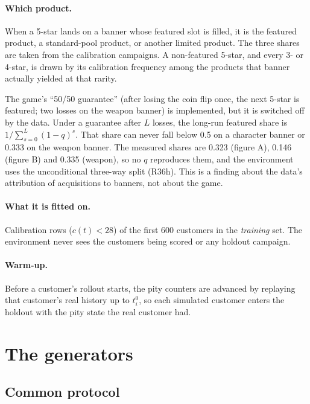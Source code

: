 \documentclass[11pt]{article}
\begin{document}
\paragraph{Which product.} When a 5-star lands on a banner whose featured slot
is filled, it is the featured product, a standard-pool product, or another
limited product. The three shares are taken from the calibration campaigns. A
non-featured 5-star, and every 3- or 4-star, is drawn by its calibration
frequency among the products that banner actually yielded at that rarity.

The game's ``50/50 guarantee'' (after losing the coin flip once, the next 5-star
is featured; two losses on the weapon banner) is implemented, but it is switched
off by the data. Under a guarantee after $L$ losses, the long-run featured share
is $1/\sum_{s=0}^{L}(1-q)^s$. That share can never fall below 0.5 on a character
banner or 0.333 on the weapon banner. The measured shares are 0.323 (figure A),
0.146 (figure B) and 0.335 (weapon), so no $q$ reproduces them, and the
environment uses the unconditional three-way split (R36h). This is a finding
about the data's attribution of acquisitions to banners, not about the game.

\paragraph{What it is fitted on.} Calibration rows ($c(t) < 28$) of the first
600 customers in the \emph{training} set. The environment never sees the
customers being scored or any holdout campaign.

\paragraph{Warm-up.} Before a customer's rollout starts, the pity counters are
advanced by replaying that customer's real history up to $t_i^0$, so each
simulated customer enters the holdout with the pity state the real customer had.

\section{The generators}\label{sec:generators}

\subsection{Common protocol}
\end{document}
